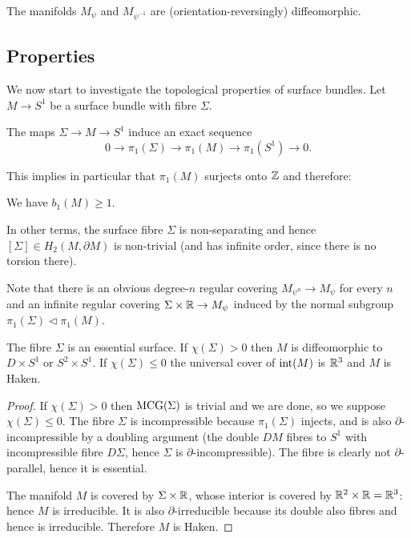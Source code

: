 The manifolds $M_\psi$ and $M_{\psi^{-1}}$ are (orientation-reversingly) diffeomorphic.

\subsection{Properties}
We now start to investigate the topological properties of surface bundles.
Let $M\to S^1$ be a surface bundle with fibre $\Sigma$.

\begin{ex}
The maps $\Sigma\to M \to S^1$ induce an exact sequence
$$0 \longrightarrow \pi_1(\Sigma) \longrightarrow \pi_1(M) \longrightarrow \pi_1(S^1) \longrightarrow 0.$$
\end{ex}

This implies in particular that $\pi_1(M)$ surjects onto $\mathbb{Z}$ and therefore:

\begin{cor}
We have $b_1(M)\geqslant 1$.
\end{cor}

In other terms, the surface fibre $\Sigma$ is non-separating and hence $[\Sigma]\in H_2(M,\partial M)$ is non-trivial (and has infinite order, since there is no torsion there).

Note that there is an obvious degree-$n$ regular covering $M_{\psi^n} \to M_{\psi}$ for every $n$ and an infinite regular covering $\Sigma\times \mathbb{R} \to M_{\psi}$ induced by the normal subgroup $\pi_1(\Sigma) \triangleleft \pi_1(M)$. 

\begin{prop}
The fibre $\Sigma$ is an essential surface.
If $\chi(\Sigma)>0$ then $M$ is diffeomorphic to $D\times S^1$ or $S^2\times S^1$.
If $\chi(\Sigma)\leqslant 0$ the universal cover of ${\rm int}(M)$ is $\mathbb{R}^3$ and $M$ is Haken.
\end{prop}
\begin{proof}
If $\chi(\Sigma)>0$ then ${\rm MCG}(\Sigma)$ is trivial and we are done, so we suppose $\chi(\Sigma)\leqslant 0$. The fibre $\Sigma$ is incompressible because $\pi_1(\Sigma)$ injects, and is also $\partial$-incompressible by a doubling argument (the double $DM$ fibres to $S^1$ with incompressible fibre $D\Sigma$, hence $\Sigma$ is $\partial$-incompressible). The fibre is clearly not $\partial$-parallel, hence it is essential.

The manifold $M$ is covered by $\Sigma \times \mathbb{R}$, whose interior is covered by $\mathbb{R}^2 \times \mathbb{R} = \mathbb{R}^3$: hence $M$ is irreducible. It is also $\partial$-irreducible because its double also fibres and hence is irreducible. Therefore $M$ is Haken. 
\end{proof}


